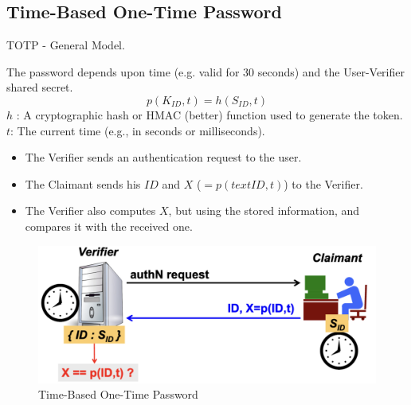 \subsection{Time-Based One-Time Password}
\begin{center}
    TOTP - General Model.
\end{center}
The password depends upon time (e.g. valid for 30 seconds) and the User-Verifier shared secret.
\[
    \boxed{p(K_{ID}, t)=h(S_{ID}, t)}
\]
$h$ : A cryptographic hash or HMAC (better) function used to generate the token.\\
$t$: The current time (e.g., in seconds or milliseconds).
\begin{multicols}{2}

    \begin{itemize}
        \item The Verifier sends an authentication request to the user.
        \item The Claimant sends his $ID$ and $X$ ($=p(text{ID}, t)$) to the Verifier. 
        \item The Verifier also computes $X$, but using the stored information, and compares it with the received one.
    \end{itemize}
\columnbreak

    \begin{figure}[H]
        \centering
        \includegraphics[width=\linewidth]{Images/Authentication/totp.png}
        \caption{Time-Based One-Time Password}
    \end{figure}
\end{multicols}

